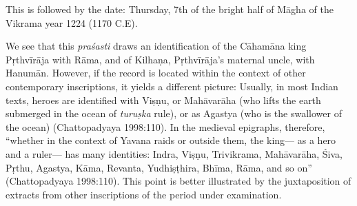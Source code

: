 This is followed by the date: Thursday, 7th of the bright half of Māgha of the Vikrama year 1224 (1170 C.E).

We see that this {\sl praśasti} draws an identification of the Cāhamāna king Pṛthvīrāja with Rāma, and of Kilhaṇa, Pṛthvīrāja’s maternal uncle, with Hanumān. However, if the record is located within the context of other contemporary inscriptions, it yields a different picture: Usually, in most Indian texts, heroes are identified with Viṣṇu, or Mahāvarāha (who lifts the earth submerged in the ocean of {\sl turuṣka} rule), or as Agastya (who is the swallower of the ocean) (Chattopadyaya 1998:110). In the medieval epigraphs, therefore, “whether in the context of Yavana raids or outside them, the king— as a hero and a ruler— has many identities: Indra, Viṣṇu, Trivikrama, Mahāvarāha, Śiva, Pṛthu, Agastya, Kāma, Revanta, Yudhiṣṭhira, Bhīma, Rāma, and so on” (Chattopadyaya 1998:110). This point is better illustrated by the juxtaposition of extracts from other inscriptions of the period under examination. 

